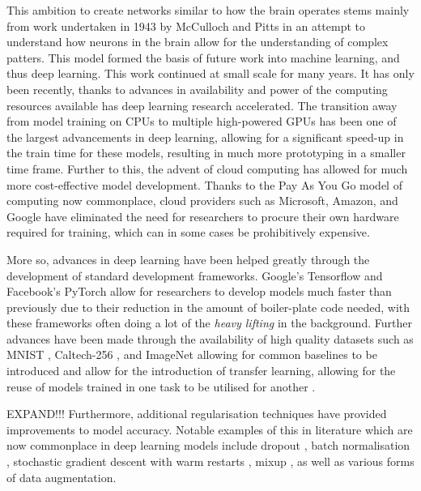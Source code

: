 This ambition to create networks similar to how the brain operates stems mainly from work undertaken in 1943 by McCulloch and Pitts \cite{mcculloch_logical_1943} in an attempt to understand how neurons in the brain allow for the understanding of complex patters. This model formed the basis of future work into machine learning, and thus deep learning. This work continued at small scale for many years. It has only been recently, thanks to advances in availability and power of the computing resources available has deep learning research accelerated. The transition away from model training on CPUs to multiple high-powered GPUs has been one of the largest advancements in deep learning, allowing for a significant speed-up in the train time for these models, resulting in much more prototyping in a smaller time frame. Further to this, the advent of cloud computing has allowed for much more cost-effective model development. Thanks to the Pay As You Go model of computing now commonplace, cloud providers such as Microsoft, Amazon, and Google have eliminated the need for researchers to procure their own hardware required for training, which can in some cases be prohibitively expensive. 

More so, advances in deep learning have been helped greatly through the development of standard development frameworks. Google's Tensorflow \cite{abadi_tensorflow:_2016} and Facebook's PyTorch \cite{paszke_automatic_2017} allow for researchers to develop models much faster than previously due to their reduction in the amount of boiler-plate code needed, with these frameworks often doing a lot of the \textit{heavy lifting} in the background. Further advances have been made through the availability of high quality datasets such as MNIST \cite{lecun_gradient-based_1998}, Caltech-256 \cite{griffin_caltech-256_2007}, and ImageNet \cite{deng_imagenet:_2009} allowing for common baselines to be introduced and allow for the introduction of transfer learning, allowing for the reuse of models trained in one task to be utilised for another \cite{pan_survey_2010}.

EXPAND!!!
Furthermore, additional regularisation techniques have provided improvements to model accuracy. Notable examples of this in literature which are now commonplace in deep learning models include dropout \cite{srivastava_dropout:_2014}, batch normalisation \cite{ioffe_batch_2015}, stochastic gradient descent with warm restarts \cite{loshchilov_sgdr:_2016}, mixup \cite{zhang_mixup:_2017}, as well as various forms of data augmentation. 

